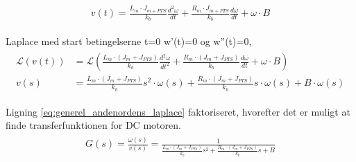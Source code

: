 \begin{align}
\begin{split}
v\left( t \right) =\frac { { L }_{ m }\cdot { J }_{ m+PTS } }{ { k }_{ b } } \frac { { d }^{ 2 }\omega  }{ dt } +\frac { { R }_{ m }\cdot { J }_{ m+PTS } }{ { k }_{ b } } \frac { d\omega  }{ dt } +\omega \cdot B\label{eq:generel_andenordens}
\end{split}
\end{align}

Laplace med start betingelserne t=0 w'(t)=0 og w''(t)=0,
\begin{align}
\begin{split}
\mathcal{L}\left( v\left( t \right)  \right) &=\mathcal{L}\left( \frac { { L }_{ m }\cdot \left( { J }_{ m }+{ J }_{ PTS } \right)  }{ { k }_{ b } } \frac { { d }^{ 2 }\omega  }{ { dt }^{ 2 } } +\frac { { R }_{ m }\cdot \left( { J }_{ m }+{ J }_{ PTS } \right)  }{ { k }_{ b } } \frac { d\omega  }{ dt } +\omega \cdot B \right) 
\\
v\left( s \right) &=\frac { { L }_{ m }\cdot \left( { J }_{ m }+{ J }_{ PTS } \right)  }{ { k }_{ b } } { s }^{ 2 }\cdot \omega \left( s \right) +\frac { { R }_{ m }\cdot \left( { J }_{ m }+{ J }_{ PTS } \right)  }{ { k }_{ b } } { s }\cdot \omega \left( s \right) +B\cdot \omega \left( s \right) 
\label{eq:generel_andenordens_laplace}
\end{split}
\end{align}



Ligning \ref{eq:generel_andenordens_laplace} faktoriseret, hvorefter det er muligt at finde transferfunktionen for DC motoren. 
\begin{align}
\begin{split}
G\left( s \right) =\frac { \omega \left( s \right)  }{ v\left( s \right)  } =\frac { 1 }{ \frac { { L }_{ m }\cdot \left( { J }_{ m }+{ J }_{ PTS } \right)  }{ { k }_{ b } } { s }^{ 2 }+\frac { { R }_{ m }\cdot \left( { J }_{ m }+{ J }_{ PTS } \right)  }{ { k }_{ b } } s+B } 
\label{eq:generel_tf}
\end{split}
\end{align}


